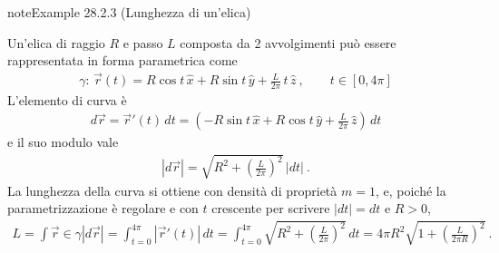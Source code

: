 \documentclass[letterpaper,10pt,italian]{jupyterBook}
\begin{document}
\begin{sphinxadmonition}{note}{Example 28.2.3 (Lunghezza di un’elica)}



\sphinxAtStartPar
Un’elica di raggio \(R\) e passo \(L\) composta da 2 avvolgimenti può essere rappresentata in forma parametrica come
\begin{equation*}
\begin{split}\gamma: \, \vec{r}(t) = R \cos t \, \hat{x} + R \sin t \, \hat{y} + \frac{L}{2\pi} \, t \, \hat{z} \ , \qquad t \in \left[ 0, 4 \pi \right]\end{split}
\end{equation*}
\sphinxAtStartPar
L’elemento di curva è
\begin{equation*}
\begin{split}d \vec{r} = \vec{r}'(t) \, dt = \left( - R \sin t \, \hat{x} + R \cos t \, \hat{y} + \frac{L}{2\pi} \, \hat{z} \right) \, dt \end{split}
\end{equation*}
\sphinxAtStartPar
e il suo modulo vale
\begin{equation*}
\begin{split}|d \vec{r}| = \sqrt{ R^2 + \left(\frac{L}{2 \pi}\right)^2 } \, |dt| \ .\end{split}
\end{equation*}
\sphinxAtStartPar
La lunghezza della curva si ottiene con densità di proprietà \(m = 1\),  e, poiché la parametrizzazione è regolare e con \(t\) crescente per scrivere \(|d t| = d t\) e \(R > 0\),
\begin{equation*}
\begin{split}L = \int{\vec{r}\in \gamma} |d \vec{r}| =\int_{t = 0}^{4 \pi} \left|\vec{r}'(t)\right| \, dt =  \int_{t = 0}^{4 \pi}  \sqrt{ R^2 + \left(\frac{L}{2 \pi}\right)^2 } \,  dt = 4 \pi R^2 \sqrt{1 + \left( \frac{L}{2 \pi R}\right)^2}  \ . \end{split}
\end{equation*}\end{sphinxadmonition}
\label{ch/vector-calculus/integrals:example-3}
\end{document}
